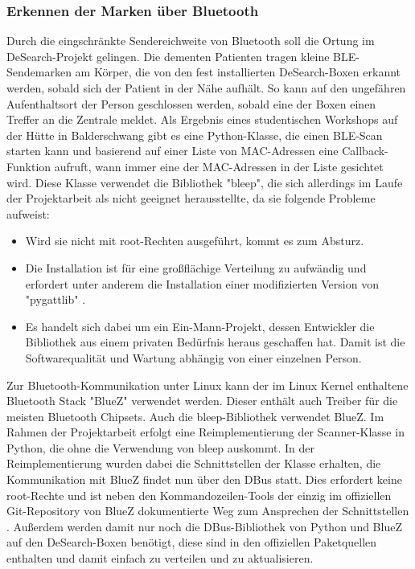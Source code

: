 \subsubsection{Erkennen der Marken über Bluetooth}\label{sssec:bluez}
Durch die eingschränkte Sendereichweite von Bluetooth soll die Ortung im DeSearch-Projekt gelingen. Die dementen Patienten tragen kleine BLE-Sendemarken am Körper, die von den fest installierten DeSearch-Boxen erkannt werden, sobald sich der Patient in der Nähe aufhält. So kann auf den ungefähren Aufenthaltsort der Person geschlossen werden, sobald eine der Boxen einen Treffer an die Zentrale meldet. \newline
Als Ergebnis eines studentischen Workshops auf der Hütte in Balderschwang gibt es eine Python-Klasse, die einen BLE-Scan starten kann und basierend auf einer Liste von MAC-Adressen eine Callback-Funktion aufruft, wann immer eine der MAC-Adressen in der Liste gesichtet wird.
Diese Klasse verwendet die Bibliothek "bleep", die sich allerdings im Laufe der Projektarbeit als nicht geeignet herausstellte, da sie folgende Probleme aufweist:
\begin{itemize}
	\item Wird sie nicht mit root-Rechten ausgeführt, kommt es zum Absturz.
	\item Die Installation ist für eine großflächige Verteilung zu aufwändig und erfordert unter anderem die Installation einer modifizierten Version von "pygattlib" \citep[Vgl.][]{bleep-installation}.
	\item Es handelt sich dabei um ein Ein-Mann-Projekt, dessen Entwickler die Bibliothek aus einem privaten Bedürfnis heraus geschaffen hat. Damit ist die Softwarequalität und Wartung abhängig von einer einzelnen Person.
\end{itemize}
Zur Bluetooth-Kommunikation unter Linux kann der im Linux Kernel enthaltene Bluetooth Stack "BlueZ" verwendet werden. Dieser enthält auch Treiber für die meisten Bluetooth Chipsets.
Auch die bleep-Bibliothek verwendet BlueZ. Im Rahmen der Projektarbeit erfolgt eine Reimplementierung der Scanner-Klasse in Python, die ohne die Verwendung von bleep auskommt.
In der Reimplementierung wurden dabei die Schnittstellen der Klasse erhalten, die Kommunikation mit BlueZ findet nun über den DBus statt. Dies erfordert keine root-Rechte und ist neben den Kommandozeilen-Tools der einzig im offiziellen Git-Repository von BlueZ dokumentierte Weg zum Ansprechen der Schnittstellen \citep[Vgl.][]{bluez-git}. Außerdem werden damit nur noch die DBus-Bibliothek von Python und BlueZ auf den DeSearch-Boxen benötigt, diese sind in den offiziellen Paketquellen enthalten und damit einfach zu verteilen und zu aktualisieren.

